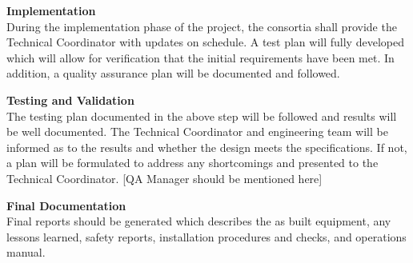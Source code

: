 {\bf Implementation}\\ During the implementation phase of the project,
the consortia shall provide the Technical Coordinator with updates on
schedule.  A test plan will fully developed which will allow for
verification that the initial requirements have been met. In addition,
a quality assurance plan will be documented and followed.

{\bf Testing and Validation\\}
The testing plan documented in the above step will be followed and
results will be well documented.  The Technical Coordinator and
engineering team will be informed as to the results and whether the
design meets the specifications.  If not, a plan will be formulated
to address any shortcomings and presented to the Technical
Coordinator. [QA Manager should be mentioned here]

{\bf Final Documentation\\}
Final reports should be generated which describes the as built
equipment, any lessons learned, safety reports, installation procedures
and checks, and operations manual.
